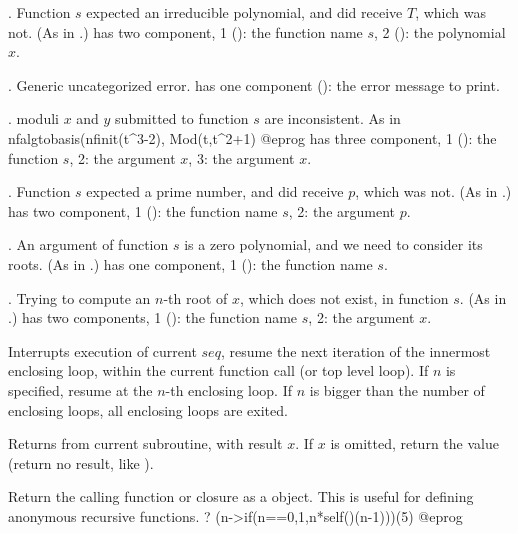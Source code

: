  \item {}. Function $s$ expected an irreducible polynomial,
 and did receive $T$, which was not. (As in .)
  has two component, 1 (): the function name $s$,
 2 (): the polynomial $x$.

 \item {}. Generic uncategorized error.
  has one component (): the error message to print.

 \item {}. moduli $x$ and $y$ submitted to function $s$ are
 inconsistent. As in
 \bprog
   nfalgtobasis(nfinit(t^3-2), Mod(t,t^2+1)
 @eprog\noindent
  has three component, 1 (): the function $s$,
 2: the argument $x$, 3: the argument $x$.

 \item {}. Function $s$ expected a prime number,
 and did receive $p$, which was not. (As in .)
  has two component, 1 (): the function name $s$,
 2: the argument $p$.

 \item {}. An argument of function $s$ is a zero polynomial,
 and we need to consider its roots. (As in .)  has
 one component, 1 (): the function name $s$.

 \item {}. Trying to compute an $n$-th root of $x$, which does
 not exist, in function $s$. (As in .)
  has two components, 1 (): the function name $s$,
 2: the argument $x$.

\label{se:next}
Interrupts execution of current $seq$,
resume the next iteration of the innermost enclosing loop, within the
current function call (or top level loop). If $n$ is specified, resume at
the $n$-th enclosing loop. If $n$ is bigger than the number of enclosing
loops, all enclosing loops are exited.

\label{se:return}
Returns from current subroutine, with
result $x$. If $x$ is omitted, return the  value (return no
result, like ).

\label{se:self}
Return the calling function or closure as a  object.
This is useful for defining anonymous recursive functions.
\bprog
? (n->if(n==0,1,n*self()(n-1)))(5)
@eprog


